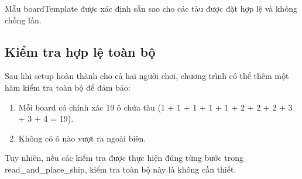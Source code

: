 Mẫu boardTemplate được xác định sẵn sao cho các tàu được đặt hợp lệ và không chồng lấn.

\subsection{Kiểm tra hợp lệ toàn bộ}

Sau khi setup hoàn thành cho cả hai người chơi, chương trình có thể thêm một hàm kiểm tra toàn bộ để đảm bảo:
\begin{enumerate}
    \item Mỗi board có chính xác 19 ô chứa tàu (1 + 1 + 1 + 1 + 1 + 2 + 2 + 2 + 3 + 3 + 4 = 19).
    \item Không có ô nào vượt ra ngoài biên.
\end{enumerate}

Tuy nhiên, nếu các kiểm tra được thực hiện đúng từng bước trong read\_and\_place\_ship, kiểm tra toàn bộ này là không cần thiết.
